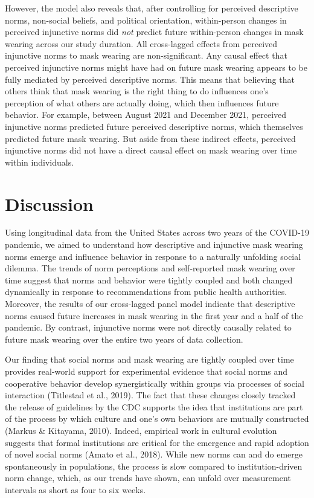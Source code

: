 \documentclass[
  man, donotrepeattitle,mask,floatsintext]{apa6}
\begin{document}
However, the model also reveals that, after controlling for perceived descriptive norms, non-social beliefs, and political orientation, within-person changes in perceived injunctive norms did \emph{not} predict future within-person changes in mask wearing across our study duration. All cross-lagged effects from perceived injunctive norms to mask wearing are non-significant. Any causal effect that perceived injunctive norms might have had on future mask wearing appears to be fully mediated by perceived descriptive norms. This means that believing that others think that mask wearing is the right thing to do influences one's perception of what others are actually doing, which then influences future behavior. For example, between August 2021 and December 2021, perceived injunctive norms predicted future perceived descriptive norms, which themselves predicted future mask wearing. But aside from these indirect effects, perceived injunctive norms did not have a direct causal effect on mask wearing over time within individuals.

\hypertarget{discussion}{%
\section{Discussion}\label{discussion}}

Using longitudinal data from the United States across two years of the COVID-19 pandemic, we aimed to understand how descriptive and injunctive mask wearing norms emerge and influence behavior in response to a naturally unfolding social dilemma. The trends of norm perceptions and self-reported mask wearing over time suggest that norms and behavior were tightly coupled and both changed dynamically in response to recommendations from public health authorities. Moreover, the results of our cross-lagged panel model indicate that descriptive norms caused future increases in mask wearing in the first year and a half of the pandemic. By contrast, injunctive norms were not directly causally related to future mask wearing over the entire two years of data collection.

Our finding that social norms and mask wearing are tightly coupled over time provides real-world support for experimental evidence that social norms and cooperative behavior develop synergistically within groups via processes of social interaction (Titlestad et al., 2019). The fact that these changes closely tracked the release of guidelines by the CDC supports the idea that institutions are part of the process by which culture and one's own behaviors are mutually constructed (Markus \& Kitayama, 2010). Indeed, empirical work in cultural evolution suggests that formal institutions are critical for the emergence and rapid adoption of novel social norms (Amato et al., 2018). While new norms can and do emerge spontaneously in populations, the process is slow compared to institution-driven norm change, which, as our trends have shown, can unfold over measurement intervals as short as four to six weeks.
\end{document}

